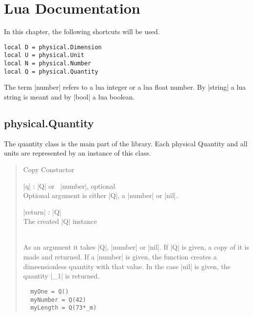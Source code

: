 \documentclass{ltxdoc}
\begin{document}
\lstset{language=Lua}




\newpage
\section{Lua Documentation}

In this chapter, the following shortcuts will be used.
\begin{lstlisting}
local D = physical.Dimension
local U = physical.Unit
local N = physical.Number
local Q = physical.Quantity
\end{lstlisting}

The term |number| refers to a lua integer or a lua float number. By |string| a lua string is meant and by |bool| a lua boolean.






\subsection{physical.Quantity}
The quantity class is the main part of the library. Each physical Quantity and all units are represented by an instance of this class.


\begin{quote}
  Copy Constuctor

  \subtitle{Parameters}
  \begin{description}
    \item |q| : |Q| or \ |number|, optional\\
      Optional argument is either |Q|, a |number| or |nil|.

    \item |return| : |Q|\\
      The created |Q| instance
  \end{description}

  \subtitle{Note}\\
  As an argument it takes |Q|, |number| or |nil|. If |Q| is given, a copy of it is made and returned. If a |number| is given, the function creates a dimeensionless quantity with that value. In the case |nil| is given, the quantity |_1| is returned.

  \subtitle{Example}
  \begin{lstlisting}
  myOne = Q()
  myNumber = Q(42)
  myLength = Q(73*_m)
  \end{lstlisting}
\end{quote}
\end{document}

